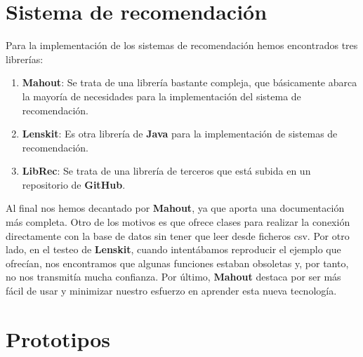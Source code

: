 \section{Sistema de recomendación}
\label{makereference3.5}
Para la implementación de los sistemas de recomendación hemos encontrados tres librerías:
\begin{enumerate}
    \item \textbf{Mahout}: Se trata de una librería bastante compleja, que básicamente abarca la mayoría de necesidades para la implementación del sistema de recomendación.
    \item \textbf{Lenskit}: Es otra librería de \textbf{Java} para la implementación de sistemas de recomendación.
    \item \textbf{LibRec}: Se trata de una librería de terceros que está subida en un repositorio de \textbf{GitHub}.
\end{enumerate}

Al final nos hemos decantado por \textbf{Mahout}, ya que aporta una documentación más completa. Otro de los motivos es que ofrece clases para realizar la conexión directamente con la base de datos 
sin tener que leer desde ficheros csv. Por otro lado, en el testeo de 
\textbf{Lenskit}, cuando intentábamos reproducir el ejemplo que ofrecían, nos encontramos que algunas funciones estaban 
obsoletas y, por tanto, no nos transmitía mucha confianza. Por último, \textbf{Mahout} destaca por ser más fácil de usar y minimizar nuestro esfuerzo en aprender esta nueva tecnología.

\section{Prototipos}
\label{makereference3.6}

